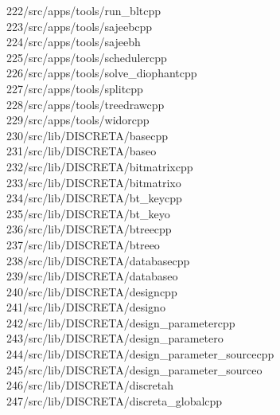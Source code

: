 \begin{tabbing}
222\>/src/apps/tools/run\_bltcpp\\[0pt]
223\>/src/apps/tools/sajeebcpp\\[0pt]
224\>/src/apps/tools/sajeebh\\[0pt]
225\>/src/apps/tools/schedulercpp\\[0pt]
226\>/src/apps/tools/solve\_diophantcpp\\[0pt]
227\>/src/apps/tools/splitcpp\\[0pt]
228\>/src/apps/tools/treedrawcpp\\[0pt]
229\>/src/apps/tools/widorcpp\\[0pt]
230\>/src/lib/DISCRETA/basecpp\\[0pt]
231\>/src/lib/DISCRETA/baseo\\[0pt]
232\>/src/lib/DISCRETA/bitmatrixcpp\\[0pt]
233\>/src/lib/DISCRETA/bitmatrixo\\[0pt]
234\>/src/lib/DISCRETA/bt\_keycpp\\[0pt]
235\>/src/lib/DISCRETA/bt\_keyo\\[0pt]
236\>/src/lib/DISCRETA/btreecpp\\[0pt]
237\>/src/lib/DISCRETA/btreeo\\[0pt]
238\>/src/lib/DISCRETA/databasecpp\\[0pt]
239\>/src/lib/DISCRETA/databaseo\\[0pt]
240\>/src/lib/DISCRETA/designcpp\\[0pt]
241\>/src/lib/DISCRETA/designo\\[0pt]
242\>/src/lib/DISCRETA/design\_parametercpp\\[0pt]
243\>/src/lib/DISCRETA/design\_parametero\\[0pt]
244\>/src/lib/DISCRETA/design\_parameter\_sourcecpp\\[0pt]
245\>/src/lib/DISCRETA/design\_parameter\_sourceo\\[0pt]
246\>/src/lib/DISCRETA/discretah\\[0pt]
247\>/src/lib/DISCRETA/discreta\_globalcpp\\[0pt]

\end{tabbing}

